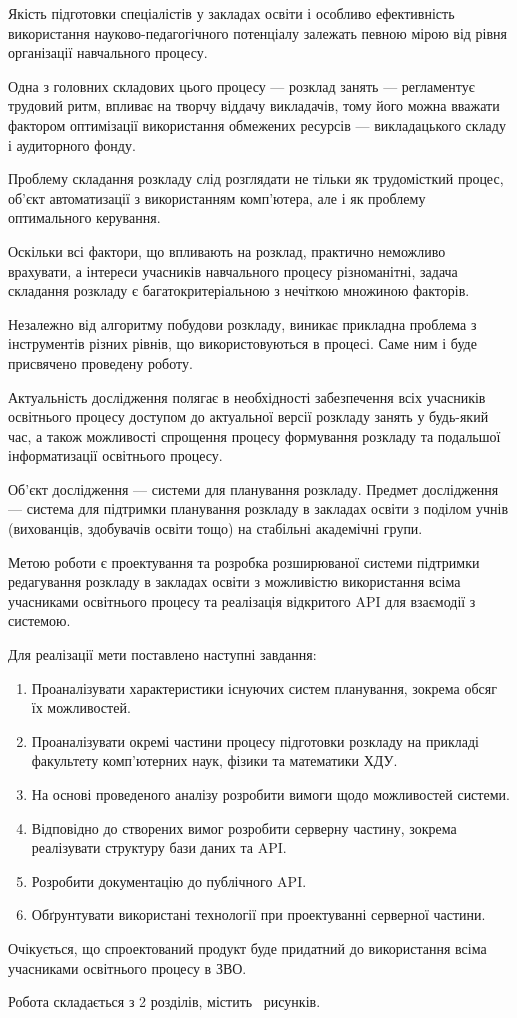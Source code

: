 
Якість підготовки спеціалістів у закладах освіти і особливо ефективність використання науково-педагогічного потенціалу залежать певною мірою від рівня організації навчального процесу.

Одна з головних складових цього процесу — розклад занять — регламентує трудовий ритм, впливає на творчу віддачу викладачів, тому його можна вважати фактором оптимізації використання обмежених ресурсів — викладацького складу і аудиторного фонду.

Проблему складання розкладу слід розглядати не тільки як трудомісткий процес, об'єкт автоматизації з використанням комп’ютера, але і як проблему оптимального керування. 

Оскільки всі фактори, що впливають на розклад, практично неможливо врахувати, а інтереси учасників навчального процесу різноманітні, задача складання розкладу є багатокритеріальною з нечіткою множиною факторів.

Незалежно від алгоритму побудови розкладу, виникає прикладна проблема з інструментів різних рівнів, що використовуються в процесі. Саме ним і буде присвячено проведену роботу.

Актуальність дослідження полягає в необхідності забезпечення всіх учасників освітнього процесу доступом до актуальної версії розкладу занять у будь-який час, а також можливості спрощення процесу формування розкладу та подальшої інформатизації освітнього процесу.

Об’єкт дослідження — системи для планування розкладу. Предмет дослідження — система для підтримки планування розкладу в закладах освіти з поділом учнів (вихованців, здобувачів освіти тощо) на стабільні академічні групи.

Метою роботи є проектування та розробка розширюваної системи підтримки редагування розкладу в закладах освіти з можливістю використання всіма учасниками освітнього процесу та реалізація відкритого API для взаємодії з системою.

Для реалізації мети поставлено наступні завдання:
\begin{enumerate}
	\item Проаналізувати характеристики існуючих систем планування, зокрема обсяг їх можливостей.
	\item Проаналізувати окремі частини процесу підготовки розкладу на прикладі факультету комп'ютерних наук, фізики та математики ХДУ.
	\item На основі проведеного аналізу розробити вимоги щодо можливостей системи.
	\item Відповідно до створених вимог розробити серверну частину, зокрема реалізувати структуру бази даних та API.
	\item Розробити документацію до публічного API.
	\item Обґрунтувати використані технології при проектуванні серверної частини.
\end{enumerate}

Очікується, що спроектований продукт буде придатний до використання всіма учасниками освітнього процесу в ЗВО.

Робота складається з 2 розділів, містить \totalfigures\ рисунків. 
